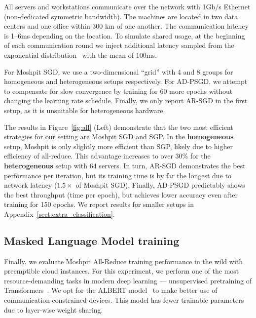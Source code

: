 All servers and workstations communicate over the network with 1Gb/s Ethernet (non-dedicated symmetric bandwidth). The machines are located in two data centers and one office within 300 km of one another. The communication latency is 1--6ms depending on the location. To simulate shared usage, at the beginning of each communication round we inject additional latency sampled from the exponential distribution~\cite{sukhov2016generating} with the mean of 100ms.

For Moshpit SGD, we use a two-dimensional ``grid'' with 4 and 8 groups for homogeneous and heterogeneous setups respectively. For AD-PSGD, we attempt to compensate for slow convergence by training for 60 more epochs without changing the learning rate schedule. Finally, we only report AR-SGD in the first setup, as it is unsuitable for heterogeneous hardware.%



The results in Figure~\ref{fig:all} (Left) demonstrate that the two most efficient strategies for our setting are Moshpit SGD and SGP. In the \textbf{homogeneous} setup, Moshpit is only slightly more efficient than SGP, likely due to higher efficiency of all-reduce. This advantage increases to over 30\% for the \textbf{heterogeneous} setup with 64 servers. In turn, AR-SGD demonstrates the best performance per iteration, but its training time is by far the longest due to network latency ($1.5{\times}$ of Moshpit SGD). Finally, AD-PSGD predictably shows the best throughput (time per epoch), but achieves lower accuracy even after training for 150 epochs. We report results for smaller setups in Appendix~\ref{sect:extra_classification}. %


\subsection{Masked Language Model training}
\label{sect:experiments_nlp}
Finally, we evaluate Moshpit All-Reduce training performance in the wild with preemptible cloud instances. For this experiment, we perform one of the most resource-demanding tasks in modern deep learning --- unsupervised pretraining of Transformers~\cite{bert,roberta,radford2019language,gpt3}.
We opt for the ALBERT model~\cite{albert} to make better use of communication-constrained devices. This model has fewer trainable parameters due to layer-wise weight sharing.

